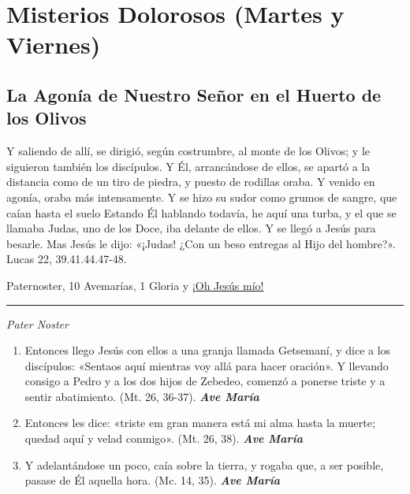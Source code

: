 \documentclass[a4paper,11pt, oneside]{report}
\begin{document}
\section*{Misterios Dolorosos (Martes y Viernes)}
\label{sec:dolorosos}
{  
  \subsection*{La Agonía de Nuestro Señor en el Huerto de los Olivos}
    {
      
        Y saliendo de allí, se dirigió, según costrumbre, al monte de los Olivos; y le siguieron también los discípulos.
        Y Él, arrancándose de ellos, se apartó a la distancia como de un tiro de piedra, y puesto de rodillas oraba. 
        Y venido en agonía, oraba más intensamente. Y se hizo su sudor como grumos de sangre, que caían hasta el suelo
        Estando Él hablando todavía, he aquí una turba, y el que se llamaba Judas, uno de los Doce, iba delante de ellos. Y se llegó a Jesús para besarle.
        Mas Jesús le dijo: «¡Judas! ¿Con un beso entregas al Hijo del hombre?». Lucas 22, 39.41.44.47-48.
        

       Paternoster, 10 Avemarías, 1 Gloria y \hyperlink{finalHuerto}{¡Oh Jesús mío!}

      \medskip

      \begin{center}\rule{1\linewidth}{\linethickness}\end{center}

      \medskip
      \textit{Pater Noster}
    
      \begin{enumerate}

        \item Entonces llego Jesús con ellos a una granja llamada Getsemaní, y dice a los discípulos: «Sentaos aquí mientras voy allá para hacer oración». 
        Y llevando consigo a Pedro y a los dos hijos de Zebedeo, comenzó a ponerse triste y a sentir abatimiento. (Mt. 26, 36-37). \textbf{\textit{Ave María}}

        \item Entonces les dice: «triste em gran manera está mi alma hasta la muerte; quedad aquí y velad conmigo». (Mt. 26, 38). \textbf{\textit{Ave María}}

        \item Y adelantándose un poco, caía sobre la tierra, y rogaba que, a ser posible, pasase de Él aquella hora. (Mc. 14, 35). \textbf{\textit{Ave María}}


\end{enumerate}}}
\end{document}
